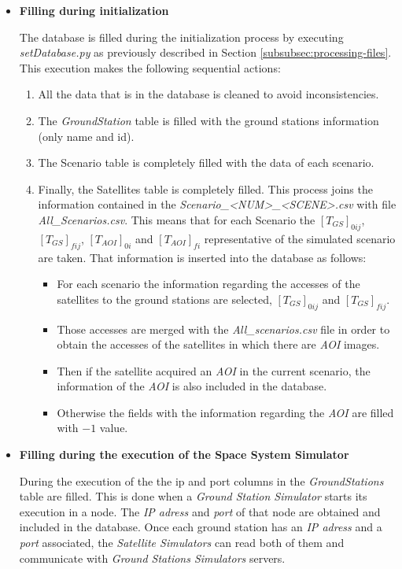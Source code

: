 \begin{itemize}

\item \textbf{Filling during initialization}

The database is filled during the initialization process by executing
\emph{setDatabase.py} as previously described in Section
\ref{subsubsec:processing-files}. This execution makes the following sequential
actions:
\begin{enumerate}
\item All the data that is in the database is cleaned to avoid inconsistencies.
\item The \emph{GroundStation} table is filled with the ground stations information (only name and id).
\item The Scenario table is completely filled with the data of each scenario.
\item Finally, the Satellites table is completely filled. This process joins the
  information contained in the \emph{Scenario\_<NUM>\_<SCENE>.csv} with file
  \emph{All\_Scenarios.csv}. This means that for each Scenario the $[T_{GS}]_{0ij}$,
  $[T_{GS}]_{fij}$,  $[T_{AOI}]_{0i}$ and $[T_{AOI}]_{fi}$ representative of the simulated
  scenario are taken. That information is inserted into the database as follows:
\begin{itemize}
\item For each scenario the information regarding the accesses of the satellites to the ground stations are selected, $[T_{GS}]_{0ij}$ and $[T_{GS}]_{fij}$.
\item Those accesses are merged with the \emph{All\_scenarios.csv} file in order to obtain the accesses of the satellites in which there are \emph{AOI} images.
\item Then if the satellite acquired an \emph{AOI} in the current scenario, the information of the \emph{AOI} is also included in the database.
\item Otherwise the fields with the information regarding the \emph{AOI} are filled
  with $-1$ value.
\end{itemize}
\end{enumerate}

\item \textbf{Filling during the execution of the Space System Simulator}

During the execution of the \gsss the ip and port columns in the
\emph{GroundStations} table are filled. This is done when a \emph{Ground Station
  Simulator} starts its execution in a node. The \emph{IP adress} and
\emph{port} of that node are obtained and included in the database. Once each
ground station has an \emph{IP adress} and a \emph{port} associated, the \emph{Satellite Simulators} can read both of them and communicate with \emph{Ground Stations Simulators} servers.

\end{itemize}



